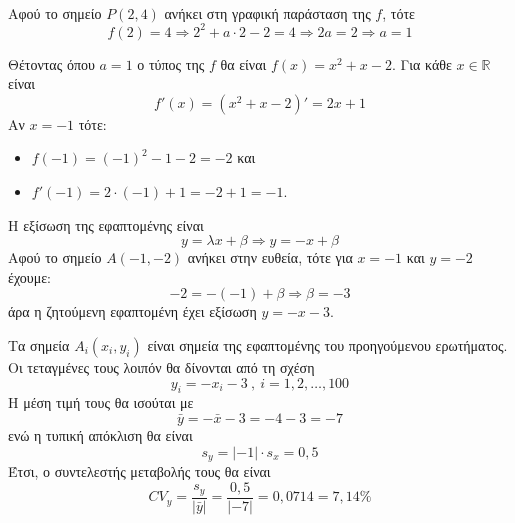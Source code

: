 \documentclass[a4paper,11pt,twoside]{article}
\def\xrwma{red!80!black}
\newcommand{\kerkissans}[1]{{\fontfamily{maksf}\selectfont {#1}}}
\newcommand{\lysh}{\textcolor{\xrwma}{\kerkissans{\noindent\faCheck\ \textbf{ΛΥΣΗ}}}\\}
\begin{document}
\lysh\vspace{-5mm}
\begin{alist}
\item Αφού το σημείο $P(2,4)$ ανήκει στη γραφική παράσταση της $f$, τότε
\[ f(2)=4\Rightarrow2^2+a\cdot2-2=4\Rightarrow 2a=2\Rightarrow a=1 \]
\item Θέτοντας όπου $a=1$ ο τύπος της $f$ θα είναι $f(x)=x^2+x-2$. Για κάθε $x\in\mathbb{R}$ είναι
\[ f'(x)=(x^2+x-2)'=2x+1 \]
Αν $x=-1$ τότε:
\begin{itemize}
\item $f(-1)=(-1)^2-1-2=-2$ και 
\item $f'(-1)=2\cdot(-1)+1=-2+1=-1$.
\end{itemize}
Η εξίσωση της εφαπτομένης είναι
\[ y=\lambda x+\beta\Rightarrow y=-x+\beta \]
Αφού το σημείο $A(-1,-2)$ ανήκει στην ευθεία, τότε για $x=-1$ και $y=-2$ έχουμε:
\[ -2=-(-1)+\beta\Rightarrow \beta=-3 \]
άρα η ζητούμενη εφαπτομένη έχει εξίσωση $y=-x-3$.
\item Τα σημεία $A_i(x_i,y_i)$ είναι σημεία της εφαπτομένης του προηγούμενου ερωτήματος. Οι τεταγμένες τους λοιπόν θα δίνονται από τη σχέση
\[ y_i=-x_i-3\ ,\ i=1,2,\ldots,100 \]
Η μέση τιμή τους θα ισούται με \[ \bar{y}=-\bar{x}-3=-4-3=-7\] ενώ η τυπική απόκλιση θα είναι
\[ s_y=|-1|\cdot s_x=0{,}5 \]
Έτσι, ο συντελεστής μεταβολής τους θα είναι
\[ CV_y=\frac{s_y}{|\bar{y}|}=\frac{0{,}5}{|-7|}=0{,}0714=7{,}14\% \]
\end{alist}
\end{document}
